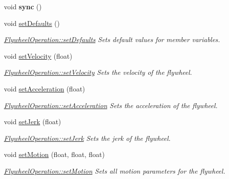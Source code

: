 \begin{DoxyCompactItemize}
\hypertarget{class_flywheel_operation_a61df04a204188bd187ce68f9d610e78a}{}\label{class_flywheel_operation_a61df04a204188bd187ce68f9d610e78a} 
void {\bfseries sync} ()
\item 
\hypertarget{class_flywheel_operation_a23b72640fdedd6d89575ea9a4ef3c69a}{}\label{class_flywheel_operation_a23b72640fdedd6d89575ea9a4ef3c69a} 
void \hyperlink{class_flywheel_operation_a23b72640fdedd6d89575ea9a4ef3c69a}{set\+Defaults} ()
\begin{DoxyCompactList}\small\item\em \hyperlink{class_flywheel_operation_a23b72640fdedd6d89575ea9a4ef3c69a}{Flywheel\+Operation\+::set\+Defaults} Sets default values for member variables. \end{DoxyCompactList}\item 
void \hyperlink{class_flywheel_operation_a30e26868333a6a7d73ae34156ba432a8}{set\+Velocity} (float)
\begin{DoxyCompactList}\small\item\em \hyperlink{class_flywheel_operation_a30e26868333a6a7d73ae34156ba432a8}{Flywheel\+Operation\+::set\+Velocity} Sets the velocity of the flywheel. \end{DoxyCompactList}\item 
void \hyperlink{class_flywheel_operation_a307929c750339cb2b46baaafa526d29f}{set\+Acceleration} (float)
\begin{DoxyCompactList}\small\item\em \hyperlink{class_flywheel_operation_a307929c750339cb2b46baaafa526d29f}{Flywheel\+Operation\+::set\+Acceleration} Sets the acceleration of the flywheel. \end{DoxyCompactList}\item 
void \hyperlink{class_flywheel_operation_a4f14dfe672793f37e21f90ecab499378}{set\+Jerk} (float)
\begin{DoxyCompactList}\small\item\em \hyperlink{class_flywheel_operation_a4f14dfe672793f37e21f90ecab499378}{Flywheel\+Operation\+::set\+Jerk} Sets the jerk of the flywheel. \end{DoxyCompactList}\item 
void \hyperlink{class_flywheel_operation_a9bcbe2d59c2a14c08b9b34d2e0c63023}{set\+Motion} (float, float, float)
\begin{DoxyCompactList}\small\item\em \hyperlink{class_flywheel_operation_a9bcbe2d59c2a14c08b9b34d2e0c63023}{Flywheel\+Operation\+::set\+Motion} Sets all motion parameters for the flywheel. \end{DoxyCompactList}\item 

\end{DoxyCompactItemize}
